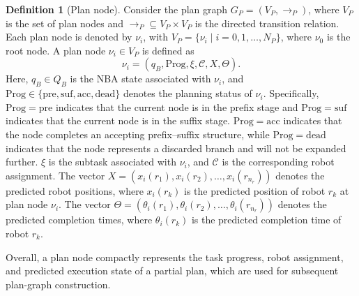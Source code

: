 \documentclass[lettersize,journal]{IEEEtran}
\theoremstyle{italiclemma}
\theoremstyle{italiclemma}
\theoremstyle{definition}
\newtheorem{definition}{Definition}
\begin{document}
\begin{definition}[Plan node]\label{def:plan_node}
Consider the plan graph $G_P=(V_P,\rightarrow_P)$, where $V_P$ is the set of plan nodes and $\rightarrow_P\subseteq V_P\times V_P$ is the directed transition relation.
Each plan node is denoted by $\nu_i$, with $V_P=\{\nu_i\mid i=0,1,\ldots,N_P\}$, where $\nu_0$ is the root node. A plan node $\nu_i\in V_P$ is defined as
\[
\nu_i =
(q_B,\mathrm{Prog},\xi,\mathcal{C},X,\Theta).
\]
Here, \(q_B\in Q_B\) is the NBA state associated with \(\nu_i\), and \(\mathrm{Prog}\in\{\mathrm{pre},\mathrm{suf},\mathrm{acc},\mathrm{dead}\}\) denotes the planning status of \(\nu_i\). Specifically, \(\mathrm{Prog}=\mathrm{pre}\) indicates that the current node is in the prefix stage and  \(\mathrm{Prog}=\mathrm{suf}\) indicates that the current node is in the suffix stage.  \(\mathrm{Prog}=\mathrm{acc}\) indicates that the node completes an accepting prefix--suffix structure, while \(\mathrm{Prog}=\mathrm{dead}\) indicates that the node represents a discarded branch and will not be expanded further. 
\(\xi\) is the subtask associated with \(\nu_i\), and \(\mathcal{C}\) is the corresponding robot assignment.
The vector $X=(x_i(r_1),x_i(r_2),\ldots,x_i(r_{n_r}))$ denotes the predicted robot positions, where \(x_i(r_k)\) is the predicted position of robot \(r_k\) at plan node \(\nu_i\). The vector
$\Theta=(\theta_i(r_1),\theta_i(r_2),\ldots,\theta_i(r_{n_r}))$
denotes the predicted completion times, where \(\theta_i(r_k)\) is the predicted completion time of robot \(r_k\).
\end{definition}

Overall, a plan node compactly represents the task progress, robot assignment, and predicted execution state of a partial plan, which are used for subsequent plan-graph construction.
\end{document}
